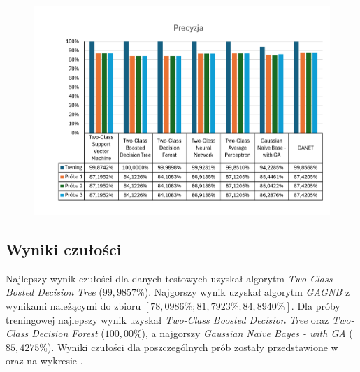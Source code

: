 \begin{figure}[H]
    \centering
    \includegraphics[width=\textwidth]{images/prec-res}
    \label{fig:prec-res}
\end{figure}

\subsection{Wyniki czułości}
Najlepszy wynik czułości dla danych testowych uzyskał algorytm \textit{Two-Class Bosted Decision Tree} ($99,9857\%$). Najgorszy wynik uzyskał algorytm \textit{GAGNB} z wynikami należącymi do zbioru $[78,0986\%; 81,7923\%; 84,8940\%]$.  Dla próby treningowej najlepszy wynik uzyskał \textit{Two-Class Boosted Decision Tree} oraz \textit{Two-Class Decision Forest} ($100,00\%$), a najgorszy \textit{Gaussian Naive Bayes - with GA} ($85,4275\%$). Wyniki czułości dla poszczególnych prób zostały przedstawione w  oraz na wykresie .

